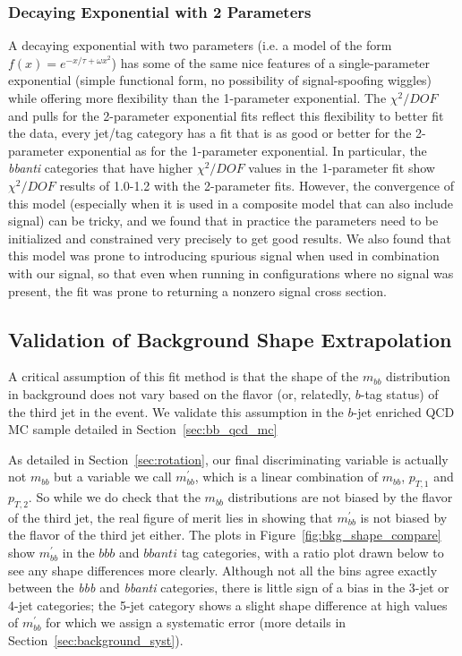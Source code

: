 \subsubsection{Decaying Exponential with 2 Parameters}
A decaying exponential with two parameters (i.e. a model of the form  $f(x)=e^{-x/\tau+\omega x^2}$)
has some of the same nice features of a single-parameter exponential (simple functional
form, no possibility of signal-spoofing wiggles) while offering
more flexibility than the 1-parameter exponential.  The $\chi^2/DOF$ and pulls
for the 2-parameter exponential fits reflect this flexibility to better
fit the data, every jet/tag category has a fit that is as good or better
for the 2-parameter exponential as for the 1-parameter exponential.  In 
particular, the \textit{bbanti} categories that have higher $\chi^2/DOF$ values
in the 1-parameter fit show $\chi^2/DOF$ results of 1.0-1.2 with the 2-parameter fits. 
However, the convergence of this model (especially when it is used in a composite
model that can also include signal) can be tricky, and we found that in practice
the parameters need to be initialized and constrained very precisely to get
good results.  We also found that this model was prone to introducing spurious
signal when used in combination with our signal, so that even when running in 
configurations where no signal was present, the fit was prone to returning
a nonzero signal cross section.




\subsection{Validation of Background Shape Extrapolation}
A critical assumption of this fit method is that the shape of the $m_{bb}$ distribution
in background does not vary based on the flavor (or, relatedly, $b$-tag status)
of the third jet in the event.  We validate this assumption in the $b$-jet enriched 
QCD MC sample detailed in Section~\ref{sec:bb_qcd_mc}

As detailed in Section~\ref{sec:rotation}, our final discriminating variable is actually
not $m_{bb}$ but a variable we call $m_{bb}^{'}$, 
which is a linear combination of $m_{bb}$, $p_{T,1}$ and $p_{T,2}$.  So while we
do check that the $m_{bb}$ distributions are not biased by the flavor of the third jet,
the real figure of merit lies in showing that $m_{bb}^{'}$ is not biased by the
flavor of the third jet either.  The plots in Figure~\ref{fig:bkg_shape_compare}
show $m_{bb}^{'}$ in the $bbb$ and $bbanti$ tag categories, with a ratio plot drawn below
to see any shape differences more clearly.  Although not all the bins agree 
exactly between the \textit{bbb} and \textit{bbanti} categories, there is little sign of a bias in the 3-jet
or 4-jet categories; the 5-jet category shows a slight shape difference at high values
of $m_{bb}^{'}$ for which we assign a systematic error (more details in Section~\ref{sec:background_syst}).

